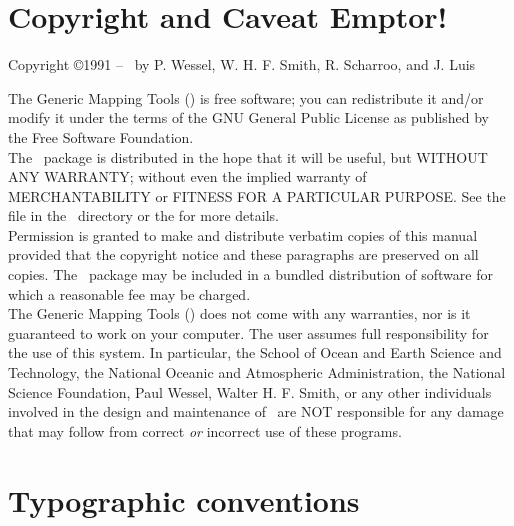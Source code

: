 
\chapter*{Copyright and Caveat Emptor!}

\begin{center}
Copyright \copyright 1991 -- \GMTDOCYEAR\ by P. Wessel, W. H. F. Smith, R. Scharroo, and J. Luis
\end{center}

\vspace{\baselineskip}

The Generic Mapping Tools (\GMT) is free software; you can redistribute
it and/or modify it under the terms of the GNU General Public License
as published by the Free Software Foundation. \\

The \GMT\ package is distributed in the hope that it will be useful, but
WITHOUT ANY WARRANTY; without even the implied warranty of
MERCHANTABILITY or FITNESS FOR A PARTICULAR PURPOSE.  See the
file  in the \GMT\ directory or the
for more details. \\

Permission is granted to make and distribute verbatim copies of this
manual provided that the copyright notice and these paragraphs are
preserved on all copies.  The \GMT\ package may be included in a bundled
distribution of software for which a reasonable fee may be charged. \\

The Generic Mapping Tools (\GMT) does not come with any warranties,
nor is it guaranteed to work on your computer.  The user assumes full
responsibility for the use of this system. In particular, the School of
Ocean and Earth Science and Technology, the National Oceanic and
Atmospheric Administration, the National Science Foundation,
Paul Wessel, Walter H. F. Smith, or any other individuals involved in
the design and maintenance of \GMT\ are NOT responsible for any damage
that may follow from correct \emph{or} incorrect use of these programs.


\chapter*{Typographic conventions}

